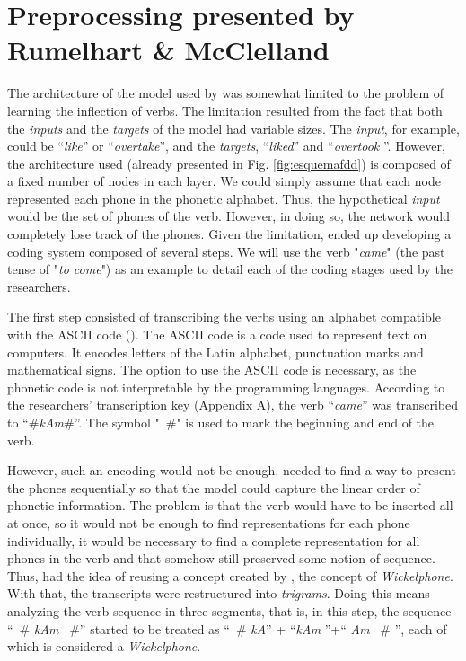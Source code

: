 \section{Preprocessing presented by Rumelhart \& McClelland}
\label{sec:transcr}
The architecture of the model used by \cite{rumelhart:1986} was somewhat limited to the problem of learning the inflection of verbs. The limitation resulted from the fact that both the \textit{inputs} and the \textit{targets} of the model had variable sizes. The \textit{input}, for example, could be “\textit{like}” or “\textit{overtake}”, and the \textit{targets}, “\textit{liked}” and “\textit{overtook} ”. However, the architecture used (already presented in Fig. \ref{fig:esquemafdd}) is composed of a fixed number of nodes in each layer. We could simply assume that each node represented each phone in the phonetic alphabet. Thus, the hypothetical \textit{input} would be the set of phones of the verb. However, in doing so, the network would completely lose track of the phones. Given the limitation, \cite{rumelhart:1986} ended up developing a coding system composed of several steps. We will use the verb "\textit{came}" (the past tense of "\textit{to come}") as an example to detail each of the coding stages used by the researchers.

The first step consisted of transcribing the verbs using an alphabet compatible with the ASCII code (\cite{mackenzie1980coded}). The ASCII code is a code
used to represent text on computers. It encodes letters of the Latin alphabet, punctuation marks and mathematical signs. The option to use the ASCII code is necessary, as the phonetic code is not interpretable by the programming languages. According to the researchers' transcription key (Appendix A), the verb “\textit{came}” was transcribed to “\#\textit{kAm}\#”. The symbol "\ #" is used to mark the beginning and end of the verb.

However, such an encoding would not be enough. \cite{rumelhart:1986} needed to find a way to present the phones sequentially so that the model could capture the linear order of phonetic information. The problem is that the verb would have to be inserted all at once, so it would not be enough to find representations for each phone individually, it would be necessary to find a complete representation for all phones in the verb and that somehow still preserved some notion of sequence.
Thus, \cite{rumelhart:1986} had the idea of reusing a concept created by \cite{wickelgren:1969}, the concept of \textit{Wickelphone}. With that, the transcripts were restructured into \textit{trigrams}. Doing this means analyzing the verb sequence in three segments, that is, in this step, the sequence “\ # \textit{kAm} \ #” started to be treated as “\ # \textit{kA}” + “\textit{kAm} ”+“ \textit{Am} \ # ”, each of which is considered a \textit{Wickelphone}.

